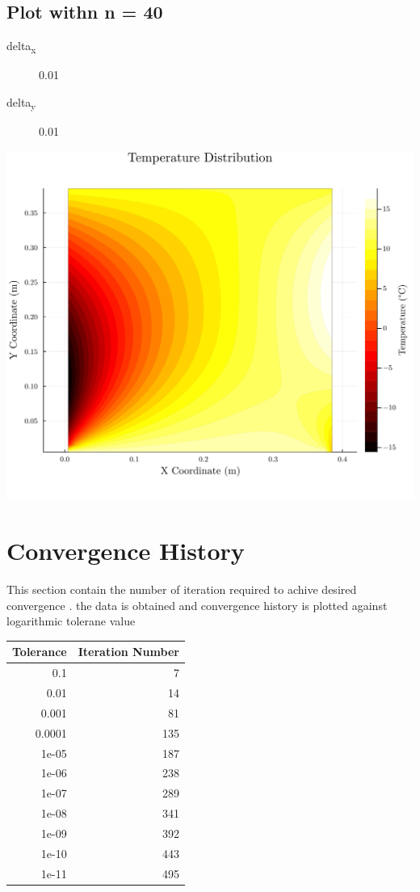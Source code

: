 \documentclass[11pt]{article}
\begin{document}
\subsection{Plot withn n = 40}
\label{sec:orgbb5db8c}

\begin{description}
\item[{delta\textsubscript{x}}] 0.01
\item[{delta\textsubscript{y}}] 0.01
\end{description}
\begin{center}
\includegraphics[width=.9\linewidth]{./plot3.png}
\end{center}
\section{Convergence History}
\label{sec:orgf722ce1}
This section contain the number of iteration required to achive desired convergence . the data is obtained and convergence history is plotted against logarithmic tolerane value

\begin{center}
\begin{tabular}{rr}
Tolerance & Iteration Number\\
\hline
0.1 & 7\\
0.01 & 14\\
0.001 & 81\\
0.0001 & 135\\
1e-05 & 187\\
1e-06 & 238\\
1e-07 & 289\\
1e-08 & 341\\
1e-09 & 392\\
1e-10 & 443\\
1e-11 & 495\\
\hline
\end{tabular}
\end{center}
\end{document}
